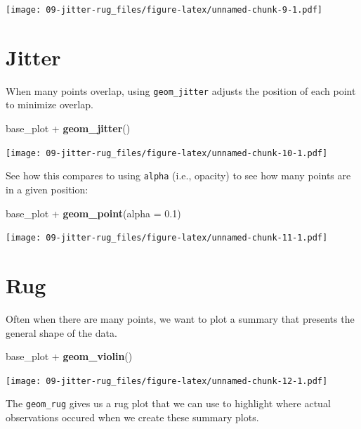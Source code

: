 \documentclass[]{book}
\newenvironment{Shaded}{\begin{snugshade}}{\end{snugshade}}
\newcommand{\KeywordTok}[1]{\textcolor[rgb]{0.13,0.29,0.53}{\textbf{{#1}}}}
\newcommand{\DataTypeTok}[1]{\textcolor[rgb]{0.13,0.29,0.53}{{#1}}}
\newcommand{\FloatTok}[1]{\textcolor[rgb]{0.00,0.00,0.81}{{#1}}}
\newcommand{\StringTok}[1]{\textcolor[rgb]{0.31,0.60,0.02}{{#1}}}
\newcommand{\NormalTok}[1]{{#1}}
\theoremstyle{definition}
\theoremstyle{definition}
\theoremstyle{remark}
\begin{document}
\texttt{[image: 09-jitter-rug\_files/figure-latex/unnamed-chunk-9-1.pdf]}

\section{Jitter}\label{jitter}

When many points overlap, using \texttt{geom\_jitter} adjusts the
position of each point to minimize overlap.

\begin{Shaded}
\begin{Highlighting}[]
\NormalTok{base_plot +}\StringTok{ }\KeywordTok{geom_jitter}\NormalTok{()}
\end{Highlighting}
\end{Shaded}

\texttt{[image: 09-jitter-rug\_files/figure-latex/unnamed-chunk-10-1.pdf]}

See how this compares to using \texttt{alpha} (i.e., opacity) to see how
many points are in a given position:

\begin{Shaded}
\begin{Highlighting}[]
\NormalTok{base_plot +}\StringTok{ }\KeywordTok{geom_point}\NormalTok{(}\DataTypeTok{alpha =} \FloatTok{0.1}\NormalTok{)}
\end{Highlighting}
\end{Shaded}

\texttt{[image: 09-jitter-rug\_files/figure-latex/unnamed-chunk-11-1.pdf]}

\section{Rug}\label{rug}

Often when there are many points, we want to plot a summary that
presents the general shape of the data.

\begin{Shaded}
\begin{Highlighting}[]
\NormalTok{base_plot +}\StringTok{ }\KeywordTok{geom_violin}\NormalTok{()}
\end{Highlighting}
\end{Shaded}

\texttt{[image: 09-jitter-rug\_files/figure-latex/unnamed-chunk-12-1.pdf]}

The \texttt{geom\_rug} gives us a rug plot that we can use to highlight
where actual observations occured when we create these summary plots.
\end{document}
